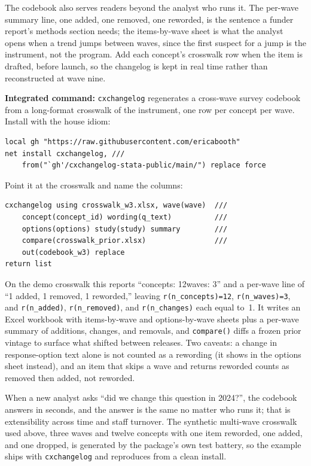 \documentclass[
    a4paper,
    fontsize=10pt,
    twoside=true,
    numbers=noenddot,
]{kaobook}
\begin{document}
The codebook also serves readers beyond the analyst who runs it. The per-wave summary line, one added, one removed, one reworded, is the sentence a funder report's methods section needs; the items-by-wave sheet is what the analyst opens when a trend jumps between waves, since the first suspect for a jump is the instrument, not the program. Add each concept's crosswalk row when the item is drafted, before launch, so the changelog is kept in real time rather than reconstructed at wave nine.

\begin{kaobox}[frametitle=Package Integration: \texttt{cxchangelog}]
\textbf{Integrated command:} \texttt{cxchangelog} regenerates a cross-wave survey codebook from a long-format crosswalk of the instrument, one row per concept per wave. Install with the house idiom:
\par
{\footnotesize
\begin{verbatim}
local gh "https://raw.githubusercontent.com/ericabooth"
net install cxchangelog, ///
    from("`gh'/cxchangelog-stata-public/main/") replace force
\end{verbatim}
}
Point it at the crosswalk and name the columns:
\par
{\footnotesize
\begin{verbatim}
cxchangelog using crosswalk_w3.xlsx, wave(wave)  ///
    concept(concept_id) wording(q_text)          ///
    options(options) study(study) summary        ///
    compare(crosswalk_prior.xlsx)                ///
    out(codebook_w3) replace
return list
\end{verbatim}
}
On the demo crosswalk this reports \enquote{concepts: 12\quad waves: 3} and a per-wave line of \enquote{1 added, 1 removed, 1 reworded,} leaving \texttt{r(n\_concepts)=12}, \texttt{r(n\_waves)=3}, and \texttt{r(n\_added)}, \texttt{r(n\_removed)}, and \texttt{r(n\_changes)} each equal to~1. It writes an Excel workbook with items-by-wave and options-by-wave sheets plus a per-wave summary of additions, changes, and removals, and \texttt{compare()} diffs a frozen prior vintage to surface what shifted between releases. Two caveats: a change in response-option text alone is not counted as a rewording (it shows in the options sheet instead), and an item that skips a wave and returns reworded counts as removed then added, not reworded.
\end{kaobox}

When a new analyst asks \enquote{did we change this question in 2024?}, the codebook answers in seconds, and the answer is the same no matter who runs it; that is extensibility across time and staff turnover. The synthetic multi-wave crosswalk used above, three waves and twelve concepts with one item reworded, one added, and one dropped, is generated by the package's own test battery, so the example ships with \texttt{cxchangelog} and reproduces from a clean install.
\end{document}
